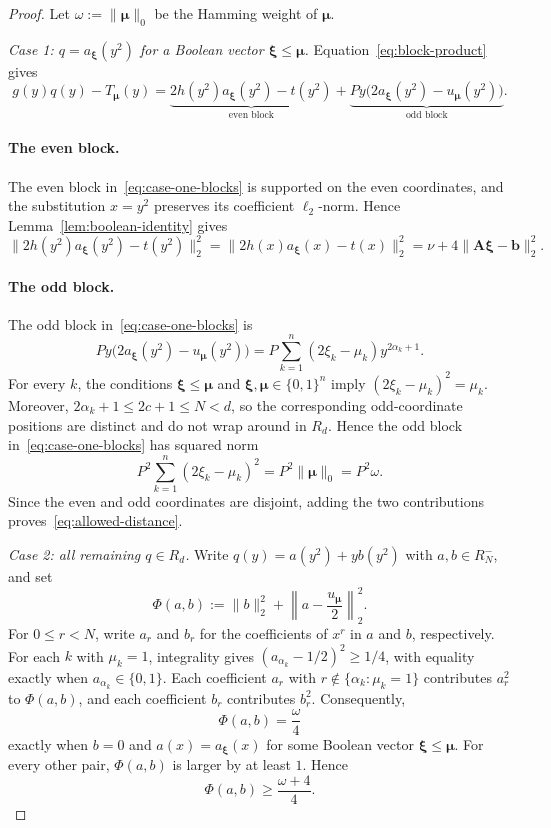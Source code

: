 \begin{proof}
Let \(\omega:=\|\boldsymbol\mu\|_0\) be the Hamming weight of
\(\boldsymbol\mu\).

\textit{Case 1: $q=a_{\boldsymbol\xi}(y^2)$ for a Boolean vector
\(\boldsymbol\xi\leq\boldsymbol\mu\).}
Equation~\eqref{eq:block-product} gives
\begin{equation}
\label{eq:case-one-blocks}
 g(y)q(y)-T_{\boldsymbol\mu}(y)
 =\underbrace{2h(y^2)a_{\boldsymbol\xi}(y^2)-t(y^2)}_{\text{even block}}
 +
 \underbrace{Py\bigl(2a_{\boldsymbol\xi}(y^2)
                   -u_{\boldsymbol\mu}(y^2)\bigr)}_{\text{odd block}}.
\end{equation}

\paragraph{The even block.}
The even block in~\eqref{eq:case-one-blocks} is supported on
the even coordinates, and the substitution \(x=y^2\) preserves its
coefficient \(\ell_2\)-norm. Hence
Lemma~\ref{lem:boolean-identity} gives
\[
 \|2h(y^2)a_{\boldsymbol\xi}(y^2)-t(y^2)\|_2^2
 =\|2h(x)a_{\boldsymbol\xi}(x)-t(x)\|_2^2
 =\nu+4\|\mathbf A\boldsymbol\xi-\mathbf b\|_2^2.
\]

\paragraph{The odd block.}
The odd block in~\eqref{eq:case-one-blocks} is
\[
 Py\bigl(2a_{\boldsymbol\xi}(y^2)-u_{\boldsymbol\mu}(y^2)\bigr)
 =P\sum_{k=1}^n(2\xi_k-\mu_k)y^{2\alpha_k+1}.
\]
For every $k$, the conditions
\(\boldsymbol\xi\leq\boldsymbol\mu\) and
\(\boldsymbol\xi,\boldsymbol\mu\in\{0,1\}^n\) imply
\((2\xi_k-\mu_k)^2=\mu_k\).  Moreover,
\(2\alpha_k+1\leq2c+1\leq N<d\), so the corresponding odd-coordinate
positions are distinct and do not wrap around in $R_d$.
Hence the odd block in~\eqref{eq:case-one-blocks} has squared norm
\[
 P^2\sum_{k=1}^n(2\xi_k-\mu_k)^2
 =P^2\|\boldsymbol\mu\|_0=P^2\omega.
\]
Since the even and odd coordinates are disjoint, adding the two contributions
proves~\eqref{eq:allowed-distance}.

\textit{Case 2: all remaining $q\in R_d$.}
Write $q(y)=a(y^2)+yb(y^2)$ with $a,b\in R_N^-$, and set
\[
 \Phi(a,b):=\|b\|_2^2+
 \left\|a-\frac{u_{\boldsymbol\mu}}2\right\|_2^2.
\]
For \(0\leq r<N\), write \(a_r\) and \(b_r\) for the
coefficients of \(x^r\) in \(a\) and \(b\), respectively.
For each $k$ with \(\mu_k=1\), integrality gives
\((a_{\alpha_k}-1/2)^2\geq1/4\), with equality exactly when
\(a_{\alpha_k}\in\{0,1\}\).
Each coefficient \(a_r\) with
\(r\notin\{\alpha_k:\mu_k=1\}\) contributes \(a_r^2\) to
\(\Phi(a,b)\), and each coefficient \(b_r\) contributes \(b_r^2\).
Consequently,
\[
 \Phi(a,b)=\frac\omega4
\]
exactly when $b=0$ and
\(a(x)=a_{\boldsymbol\xi}(x)\) for some Boolean vector
\(\boldsymbol\xi\leq\boldsymbol\mu\).  For every other pair,
\(\Phi(a,b)\) is larger by at least \(1\).  Hence
\[
 \Phi(a,b)\geq\frac{\omega+4}{4}.
\]


\end{proof}
